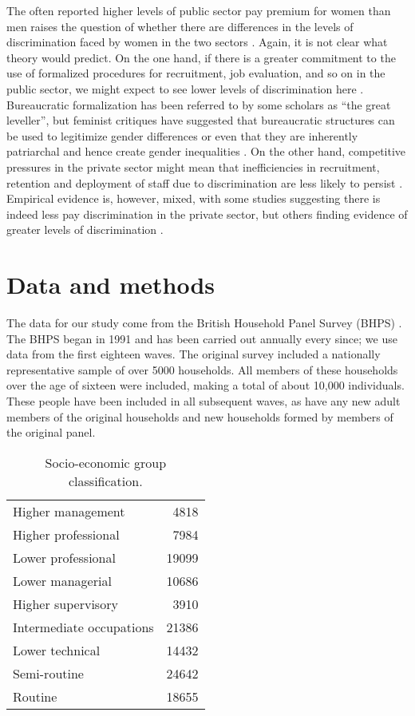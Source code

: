\documentclass[a4paper,11pt,titlepage]{article}
\begin{document}
The often reported higher levels of public sector pay premium for women than men raises the question of whether there are differences in the levels of discrimination faced by women in the two sectors \citep{Byron2010}.  Again, it is not clear what theory would predict.  On the one hand, if there is a greater commitment to the use of formalized procedures for recruitment, job evaluation, and so on in the public sector, we might expect to see lower levels of discrimination here \citep{Kaufman2002}. Bureaucratic formalization has been referred to by some scholars as ``the great leveller'', but feminist critiques have suggested that bureaucratic structures can be used to legitimize gender differences or even that they are inherently patriarchal and hence create gender inequalities \citep{Baron2007}.   On the other hand, competitive pressures in the private sector might mean that inefficiencies in recruitment, retention and deployment of staff due to discrimination are less likely to persist \citep{Becker1971}.  Empirical evidence is, however, mixed, with some studies suggesting there is indeed less pay discrimination in the private sector, but others finding evidence of greater levels of discrimination \citep{Byron2010}.

\section{Data and methods}

The data for our study come from the British Household Panel Survey (BHPS)  \citep{Taylor2010}.  The BHPS began in 1991 and has been carried out annually every since; we use data from the first eighteen waves.  The original survey included a nationally representative sample of over 5000 households.  All members of these households over the age of sixteen were included, making a total of about 10,000 individuals.  These people have been included in all subsequent waves, as have any new adult members of the original households and new households formed by members of the original panel.

\begin{table}[htb]
\caption{Socio-economic group classification.  \label{tab:SEG}}
\begin{center}
\begin{tabular}{lr}
\toprule
  Higher management & 4818 \\
  Higher professional & 7984 \\
  Lower professional & 19099 \\
  Lower managerial & 10686 \\
  Higher supervisory & 3910 \\
  Intermediate occupations & 21386 \\
  Lower technical & 14432 \\
  Semi-routine & 24642 \\
  Routine & 18655 \\
\bottomrule
\end{tabular}
\end{center}
\end{table}
\end{document}
